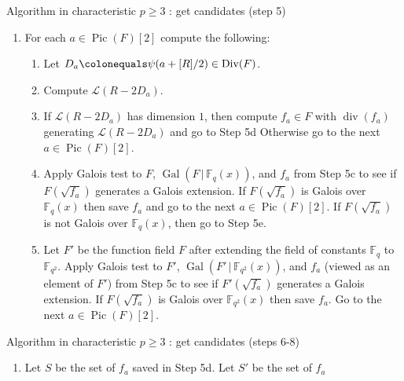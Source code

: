 \documentclass[xcolor=dvipsnames]{beamer}
\theoremstyle{plain}
\newcommand{\FF}{\mathbb{F}}
\DeclareMathOperator{\Div}{Div}
\DeclareMathOperator{\Pic}{Pic}
\DeclareMathOperator{\ddiv}{div}
\DeclareMathOperator{\Gal}{Gal}
\begin{document}
{\begin{frame}{Algorithm in characteristic $p\geq 3$ : get candidates (step 5)}
\begin{enumerate}
        \item[5.]
          For each $a\in\Pic(F)[2]$ compute the
          following:
          \pause
          \begin{enumerate}
            \item[(a)]
              Let $D_a\colonequals\psi(a+[R]/2)
              \in\Div(F)$.
              \pause
            \item[(b)]
              Compute $\mathscr{L}(R-2D_a)$.
              \pause
            \item[(c)]
              If $\mathscr{L}(R-2D_a)$ has dimension
              $1$, then compute
              $f_a\in F$ with $\ddiv(f_a)$
              generating $\mathscr{L}(R-2D_a)$
              and go to Step 5d
              Otherwise go to the next
              $a\in\Pic(F)[2]$.
              \pause
            \item[(d)]
              Apply Galois test
              to $F$,
              $\Gal(F\,|\,\FF_q(x))$,
              and $f_a$
              from Step 5c
              to see if $F(\sqrt{f_a})$
              generates a Galois extension.
              If $F(\sqrt{f_a})$ is Galois over
              $\FF_q(x)$ then save $f_a$
              and
              go to the next
              $a\in\Pic(F)[2]$.
              If $F(\sqrt{f_a})$ is not Galois
              over $\FF_q(x)$, then go to
              Step 5e.
              \pause
            \item[(e)]
              Let $F'$ be the function field
              $F$ after extending the field of
              constants $\FF_q$ to $\FF_{q^2}$.
              Apply Galois test
              to $F'$,
              $\Gal(F'\,|\,\FF_{q^2}(x))$,
              and $f_a$
              (viewed as an element of $F'$)
              from Step 5c
              to see if $F'(\sqrt{f_a})$
              generates a Galois extension.
              If $F(\sqrt{f_a})$ is Galois over
              $\FF_{q^2}(x)$ then save $f_a$.
              Go to the next
              $a\in\Pic(F)[2]$.
          \end{enumerate}
      \end{enumerate}
    \end{frame}
    \begin{frame}{Algorithm in characteristic $p\geq 3$ : get candidates (steps 6-8)}
      \begin{enumerate}
        \item[6.]
          Let $S$ be the set of $f_a$
          saved in Step 5d.
          Let $S'$ be the set of $f_a$

\end{enumerate}
\end{frame}}
\end{document}
